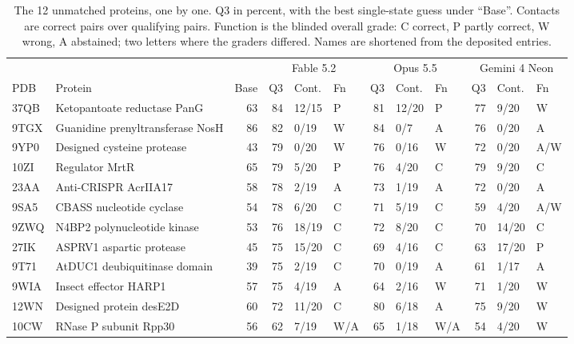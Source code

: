 \documentclass[11pt]{article}
\begin{document}
\begin{table}[ht]
\centering\small
\caption{The 12 unmatched proteins, one by one. Q3 in percent, with the best single-state guess under
``Base''. Contacts are correct pairs over qualifying pairs. Function is the blinded overall grade:
C correct, P partly correct, W wrong, A abstained; two letters where the graders differed. Names are shortened
from the deposited entries.}
\label{tab:perprotein}
\footnotesize\setlength{\tabcolsep}{3.5pt}
\begin{tabular}{llr rll rll rll}
\toprule
 & & & \multicolumn{3}{c}{Fable 5.2} & \multicolumn{3}{c}{Opus 5.5} & \multicolumn{3}{c}{Gemini 4 Neon} \\
\cmidrule(lr){4-6}\cmidrule(lr){7-9}\cmidrule(lr){10-12}
PDB & Protein & Base & Q3 & Cont. & Fn & Q3 & Cont. & Fn & Q3 & Cont. & Fn \\
\midrule
37QB & Ketopantoate reductase PanG & 63 & 84 & 12/15 & P & 81 & 12/20 & P & 77 & 9/20 & W \\
9TGX & Guanidine prenyltransferase NosH & 86 & 82 & 0/19 & W & 84 & 0/7 & A & 76 & 0/20 & A \\
9YP0 & Designed cysteine protease & 43 & 79 & 0/20 & W & 76 & 0/16 & W & 72 & 0/20 & A/W \\
10ZI & Regulator MrtR & 65 & 79 & 5/20 & P & 76 & 4/20 & C & 79 & 9/20 & C \\
23AA & Anti-CRISPR AcrIIA17 & 58 & 78 & 2/19 & A & 73 & 1/19 & A & 72 & 0/20 & A \\
9SA5 & CBASS nucleotide cyclase & 54 & 78 & 6/20 & C & 71 & 5/19 & C & 59 & 4/20 & A/W \\
9ZWQ & N4BP2 polynucleotide kinase & 53 & 76 & 18/19 & C & 72 & 8/20 & C & 70 & 14/20 & C \\
27IK & ASPRV1 aspartic protease & 45 & 75 & 15/20 & C & 69 & 4/16 & C & 63 & 17/20 & P \\
9T71 & AtDUC1 deubiquitinase domain & 39 & 75 & 2/19 & C & 70 & 0/19 & A & 61 & 1/17 & A \\
9WIA & Insect effector HARP1 & 57 & 75 & 4/19 & A & 64 & 2/16 & W & 71 & 1/20 & W \\
12WN & Designed protein desE2D & 60 & 72 & 11/20 & C & 80 & 6/18 & A & 75 & 9/20 & W \\
10CW & RNase P subunit Rpp30 & 56 & 62 & 7/19 & W/A & 65 & 1/18 & W/A & 54 & 4/20 & W \\
\bottomrule
\end{tabular}
\end{table}
\end{document}
